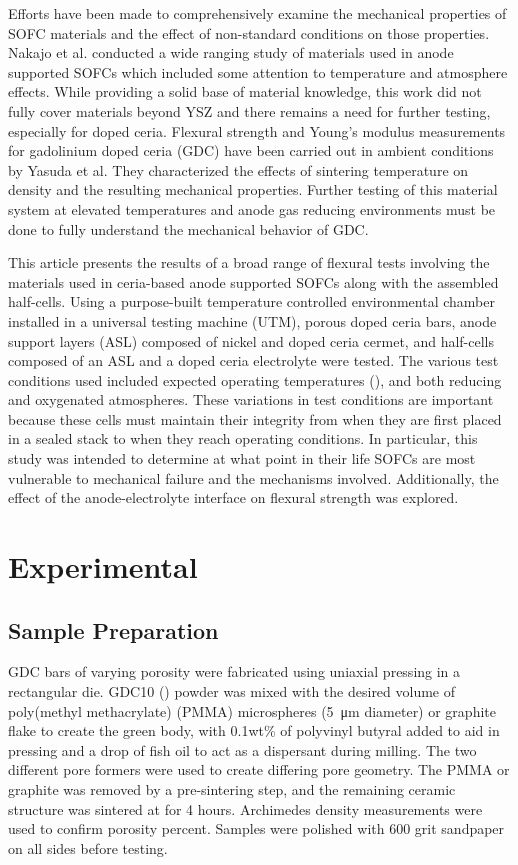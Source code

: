 Efforts have been made to comprehensively examine the mechanical properties of SOFC materials and the effect of non-standard conditions on those properties.
Nakajo et al. conducted a wide ranging study of materials used in anode supported SOFCs which included some attention to temperature and atmosphere effects.\cite{Nakajo2012}
While providing a solid base of material knowledge, this work did not fully cover materials beyond
YSZ and there remains a need for further testing, especially for doped ceria.
Flexural strength and Young's modulus measurements for gadolinium doped ceria (GDC) have been carried out in ambient conditions by Yasuda et al.\cite{Yasuda2012}
They characterized the effects of sintering temperature on density and the resulting mechanical properties.
Further testing of this material system at elevated temperatures and anode gas reducing environments must be done to fully understand the mechanical behavior of
GDC.

This article presents the results of a broad range of flexural tests involving the materials used in ceria-based anode supported SOFCs along with the assembled half-cells.
Using a purpose-built temperature controlled environmental chamber installed in a universal testing machine (UTM), porous doped ceria bars, anode support layers (ASL)
composed of nickel and doped ceria cermet, and half-cells composed of an
ASL and a doped ceria electrolyte were tested.
The various test conditions used included expected operating temperatures (), and both reducing and oxygenated atmospheres.
These variations in test conditions are important because these cells must maintain their integrity from when they are first placed in a sealed stack to when they reach operating conditions.
In particular, this study was intended to determine at what point in their life SOFCs are most vulnerable to mechanical failure and the mechanisms involved.
Additionally, the effect of the anode-electrolyte interface on flexural strength was explored.

\section{Experimental}

\subsection{Sample Preparation}

GDC bars of varying porosity were fabricated using uniaxial pressing in a rectangular die.
GDC10 () powder was mixed with the desired volume of poly(methyl methacrylate) (PMMA) microspheres (\SI{5}{\micro\meter} diameter) or graphite flake to create the green body, with 0.1wt\% of polyvinyl butyral added to aid in pressing and a drop of fish oil to act as a dispersant during milling.
The two different pore formers were used to create differing pore geometry.
The PMMA or graphite was removed by a  pre-sintering step, and the remaining ceramic structure was sintered at  for 4 hours.
Archimedes density measurements were used to confirm porosity percent.
Samples were polished with 600 grit sandpaper on all sides before testing.

